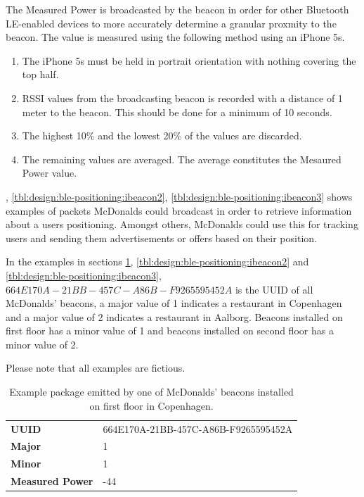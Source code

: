 The Measured Power is broadcasted by the beacon in order for other Bluetooth LE-enabled devices to more accurately determine a granular proxmity to the beacon. The value is measured using the following method \cite{apple:proximity-beacon-spec} using an iPhone 5s.

\begin{enumerate}
\item The iPhone 5s must be held in portrait orientation with nothing covering the top half.
\item RSSI values from the broadcasting beacon is recorded with a distance of 1 meter to the beacon. This should be done for a minimum of 10 seconds.
\item The highest 10\% and the lowest 20\% of the values are discarded.
\item The remaining values are averaged. The average constitutes the Mesaured Power value.
\end{enumerate}

, \cref{tbl:design:ble-positioning:ibeacon2}, \cref{tbl:design:ble-positioning:ibeacon3} shows examples of packets McDonalds could broadcast in order to retrieve information about a users positioning. Amongst others, McDonalds could use this for tracking users and sending them advertisements or offers based on their position.

In the examples in sections \cref{tbl:design:ble-positioning:ibeacon1}, \cref{tbl:design:ble-positioning:ibeacon2} and \cref{tbl:design:ble-positioning:ibeacon3}, $664E170A-21BB-457C-A86B-F9265595452A$ is the UUID of all McDonalds' beacons, a major value of 1 indicates a restaurant in Copenhagen and a major value of 2 indicates a restaurant in Aalborg. Beacons installed on first floor has a minor value of 1 and beacons installed on second floor has a minor value of 2.

Please note that all examples are fictious.

\begin{table}[h!]
\centering
\caption{Example package emitted by one of McDonalds' beacons installed on first floor in Copenhagen.}
\label{tbl:design:ble-positioning:ibeacon1}
\begin{tabular}{ll}
\textbf{UUID}  & 664E170A-21BB-457C-A86B-F9265595452A \\
\textbf{Major} & 1                                    \\
\textbf{Minor} & 1            \\                        
\textbf{Measured Power} & -44
\end{tabular}
\end{table}

